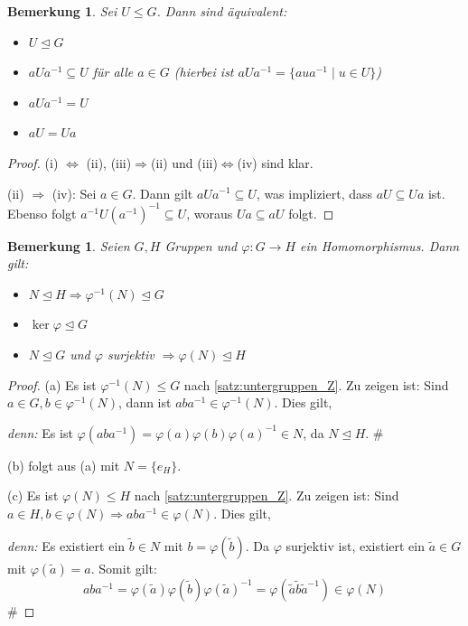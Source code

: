 \documentclass[a4paper, twoside, 11pt, ngerman]{report}
\theoremstyle{definistyle}
\newtheorem{bem}[satz]{Bemerkung}
\theoremstyle{remark}
\newenvironment{denn}%
  {\par\textit{denn:}}%
  {\hfill\#\par}
\begin{document}
\begin{bem}\label{bem:normalteiler_eigenschaften}
Sei $U \leq G$. Dann sind äquivalent:
\begin{itemize}
    \item[(i)] $U \trianglelefteq G$
    \item[(ii)] $aUa^{-1} \subseteq U$ für alle $a \in G$ (hierbei ist $aUa^{-1} = \{ aua^{-1} \mid u \in U \}$)
    \item[(iii)] $aUa^{-1} = U$
    \item[(iv)] $aU = Ua$
\end{itemize}
\end{bem}

\begin{proof}
(i) $\Leftrightarrow$ (ii), (iii)$\Rightarrow$(ii) und (iii)$\Leftrightarrow$(iv) sind klar.

(ii) $\Rightarrow$ (iv): Sei $a \in G$. Dann gilt $aUa^{-1} \subseteq U$, was impliziert, dass $aU \subseteq Ua$ ist. Ebenso folgt $a^{-1}U(a^{-1})^{-1} \subseteq U$, woraus $Ua \subseteq aU$ folgt.
\end{proof}

\begin{bem}\label{bem:normalteiler_homomorphismus}
Seien $G, H$ Gruppen und $\varphi \colon G \to H$ ein Homomorphismus.
Dann gilt:
\begin{itemize}
    \item[(a)] $N \trianglelefteq H \Rightarrow \varphi^{-1}(N) \trianglelefteq G$
    \item[(b)] $\ker \varphi \trianglelefteq G$
    \item[(c)] $N \trianglelefteq G$ und $\varphi$ surjektiv $\Rightarrow \varphi(N) \trianglelefteq H$
\end{itemize}
\end{bem}

\begin{proof}
(a) Es ist $\varphi^{-1}(N) \leq G$ nach \ref{satz:untergruppen_Z}. Zu zeigen ist: Sind $a \in G, b \in \varphi^{-1}(N)$, dann ist $aba^{-1} \in \varphi^{-1}(N)$. Dies gilt, 
\begin{denn}
Es ist $\varphi(aba^{-1}) = \varphi(a)\varphi(b)\varphi(a)^{-1} \in N$, da $N \trianglelefteq H$.
\end{denn}
(b) folgt aus (a) mit $N = \{e_H\}$.

(c) Es ist $\varphi(N) \leq H$ nach \ref{satz:untergruppen_Z}. Zu zeigen ist: Sind $a \in H, b \in \varphi(N) \Rightarrow aba^{-1} \in \varphi(N)$. Dies gilt, 
\begin{denn}
Es existiert ein $\tilde{b} \in N$ mit $b = \varphi(\tilde{b})$. Da $\varphi$ surjektiv ist, existiert ein $\tilde{a} \in G$ mit $\varphi(\tilde{a}) = a$. Somit gilt:
\[
aba^{-1} = \varphi(\tilde{a}) \varphi(\tilde{b}) \varphi(\tilde{a})^{-1} = \varphi(\tilde{a} \tilde{b} \tilde{a}^{-1}) \in \varphi(N)
\]
\end{denn}
\end{proof}
\end{document}
